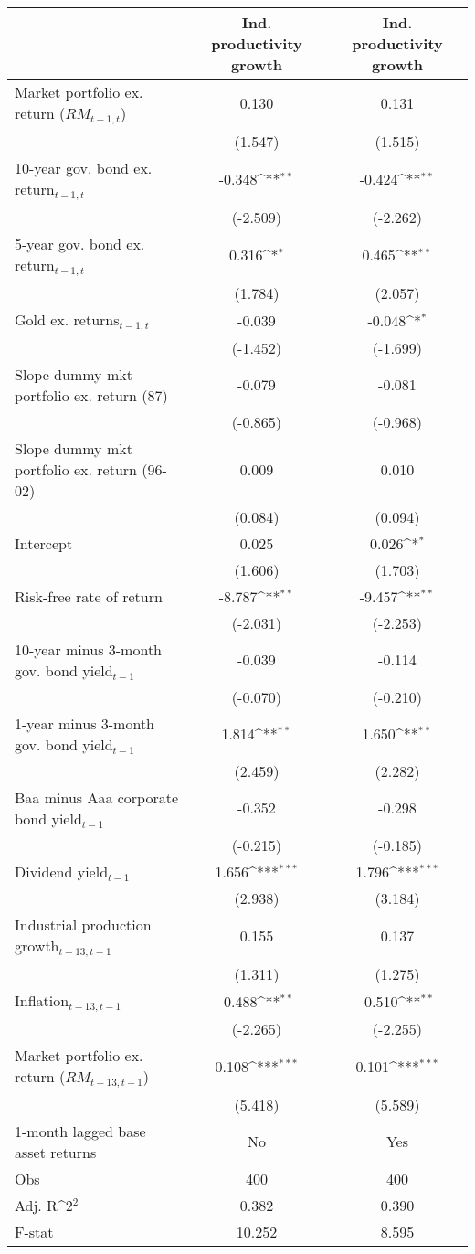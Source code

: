 {
\def\sym#1{\ifmmode^{#1}\else\(^{#1}\)\fi}
\begin{tabular}{@{\extracolsep{2pt}}l*{2}{c}@{}}
\hline\hline


 & Ind. productivity growth & Ind. productivity growth \\
\hline
Market portfolio ex. return ($RM_{t-1,t}$) & 0.130 & 0.131 \\
 & (1.547) & (1.515) \\
10-year gov. bond ex. return$_{t-1,t}$ & -0.348\sym{**} & -0.424\sym{**} \\
 & (-2.509) & (-2.262) \\
5-year gov. bond ex. return$_{t-1,t}$ & 0.316\sym{*} & 0.465\sym{**} \\
 & (1.784) & (2.057) \\
Gold ex. returns$_{t-1,t}$ & -0.039 & -0.048\sym{*} \\
 & (-1.452) & (-1.699) \\
Slope dummy mkt portfolio ex. return (87) & -0.079 & -0.081 \\
 & (-0.865) & (-0.968) \\
Slope dummy mkt portfolio ex. return (96-02) & 0.009 & 0.010 \\
 & (0.084) & (0.094) \\
Intercept & 0.025 & 0.026\sym{*} \\
 & (1.606) & (1.703) \\
Risk-free rate of return & -8.787\sym{**} & -9.457\sym{**} \\
 & (-2.031) & (-2.253) \\
10-year minus 3-month gov. bond yield$_{t-1}$ & -0.039 & -0.114 \\
 & (-0.070) & (-0.210) \\
1-year minus 3-month gov. bond yield$_{t-1}$ & 1.814\sym{**} & 1.650\sym{**} \\
 & (2.459) & (2.282) \\
Baa minus Aaa corporate bond yield$_{t-1}$ & -0.352 & -0.298 \\
 & (-0.215) & (-0.185) \\
Dividend yield$_{t-1}$ & 1.656\sym{***} & 1.796\sym{***} \\
 & (2.938) & (3.184) \\
Industrial production growth$_{t-13,t-1}$ & 0.155 & 0.137 \\
 & (1.311) & (1.275) \\
Inflation$_{t-13,t-1}$ & -0.488\sym{**} & -0.510\sym{**} \\
 & (-2.265) & (-2.255) \\
Market portfolio ex. return ($RM_{t-13,t-1}$) & 0.108\sym{***} & 0.101\sym{***} \\
 & (5.418) & (5.589) \\
1-month lagged base asset returns & No & Yes \\

\hline
Obs & 400 & 400 \\
Adj. R\sym{2} & 0.382 & 0.390 \\
F-stat & 10.252 & 8.595 \\
\hline\hline
\end{tabular}
}